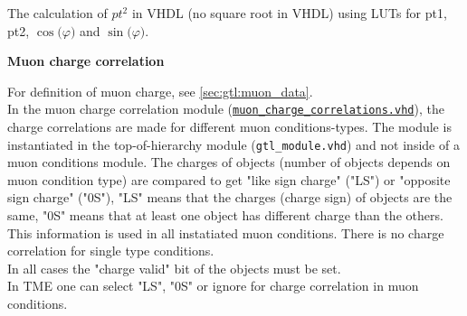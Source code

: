 The calculation of ${pt^2}$ in VHDL (no square root in VHDL) using LUTs for pt1, pt2, $\cos($$\varphi$$)$ and $\sin($$\varphi$$)$.



\textbf{Muon charge correlation}
\label{sec:gtl:muon_charge_correlation_module}

For definition of muon charge, see \ref{sec:gtl:muon_data}.\\
In the muon charge correlation module (\href{https://github.com/cms-l1-globaltrigger/mp7_ugt_legacy/tree/master/firmware/hdl/gt_mp7_core/gtl_fdl_wrapper/gtl/muon_charge_correlations.vhd}{\texttt{muon\_charge\_correlations.vhd}}), the charge correlations are made for different muon conditions-types. The module is instantiated in the top-of-hierarchy module (\texttt{gtl\_module.vhd})
and not inside of a muon conditions module.
The charges of objects (number of objects depends on muon condition type) are compared to get "like sign charge" ("LS") or "opposite sign charge" ("0S"), "LS" means that the charges (charge sign)
of objects are the same, "0S" means that at least one object has different charge than the others. This information is used in all instatiated muon conditions.
There is no charge correlation for single type conditions.\\
In all cases the "charge valid" bit of the objects must be set.\\
In TME one can select "LS", "0S" or ignore for charge correlation in muon conditions.\\

%
%
%
%
%
%

